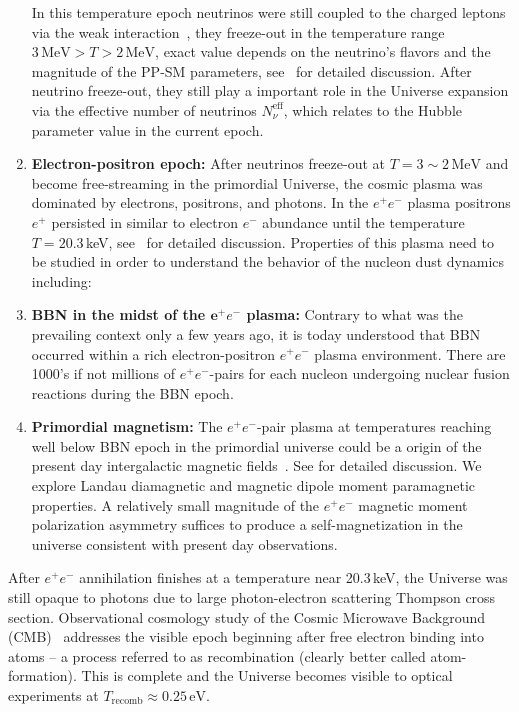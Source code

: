 \begin{enumerate}
In this temperature epoch neutrinos were still coupled to the charged leptons via the weak interaction~\cite{Birrell:2012gg,Birrell:2014ona}, they freeze-out in the temperature range $3\,\mathrm{MeV}>T>2\,\mathrm{MeV}$, exact value depends on the neutrino's flavors and the magnitude of the PP-SM parameters, see~ for detailed discussion. After neutrino freeze-out, they still play a important role in the Universe expansion via the effective number of neutrinos $N_{\nu}^{\mathrm{eff}}$, which relates to the Hubble parameter value in the current epoch.
%
\item \textbf{Electron-positron epoch:} After neutrinos freeze-out at $T=3\sim 2\,\mathrm{MeV}$ and become free-streaming in the primordial Universe, the cosmic plasma was dominated by electrons, positrons, and photons. In the $e^+e^-$ plasma positrons $e^+$ persisted in similar to electron $e^-$ abundance until the temperature $T=20.3$\,keV, see~ for detailed discussion. Properties of this plasma need to be studied in order to understand the behavior of the nucleon dust dynamics including:
%
\item \textbf{BBN in the midst of the ${\mathbf e^+e^-}$ plasma:} Contrary to what was the prevailing context only a few years ago, it is today understood that BBN occurred within a rich electron-positron $e^+e^-$ plasma environment. There are 1000's if not millions of ${ e^+e^-}$-pairs for each nucleon undergoing nuclear fusion reactions during the BBN epoch. 
%
\item \textbf{Primordial magnetism:} The $e^{+}e^{-}$-pair plasma at temperatures reaching well below BBN epoch in the primordial universe could be a origin of the present day intergalactic magnetic fields~\cite{Rafelski:2023emw,Steinmetz:2023nsc}. See  for detailed discussion. We explore Landau diamagnetic and magnetic dipole moment paramagnetic properties. A relatively small magnitude of the $e^{+}e^{-}$ magnetic moment polarization asymmetry suffices to produce a self-magnetization in the universe consistent with present day observations.
\end{enumerate}

After $e^+e^-$ annihilation finishes at a temperature near 20.3\,keV, the Universe was still opaque to photons due to large photon-electron scattering Thompson cross section. Observational cosmology study of the Cosmic Microwave Background (CMB)~\cite{Planck:2018vyg} addresses the visible epoch beginning after free electron binding into atoms -- a process referred to as recombination (clearly better called atom-formation). This is complete and the Universe becomes visible to optical experiments at $T_\mathrm{recomb}\approx 0.25\,\mathrm{eV}$. 


